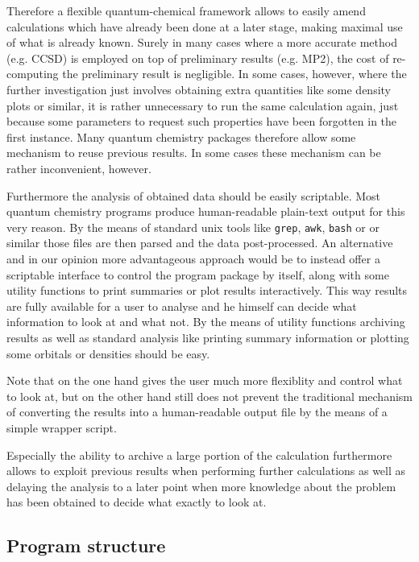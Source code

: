 Therefore a flexible quantum-chemical framework allows to
easily amend calculations which have already been done
at a later stage, making maximal use of what is already known.
Surely in many cases where a more accurate method (e.g. CCSD) is employed
on top of preliminary results (e.g. MP2),
the cost of re-computing the preliminary result is negligible.
In some cases, however,
where the further investigation just involves obtaining
extra quantities like some density plots or similar,
it is rather unnecessary to run the same calculation again,
just because some parameters to request such properties
have been forgotten in the first instance.
Many quantum chemistry packages therefore allow
some mechanism to reuse previous results.
In some cases these mechanism can be rather inconvenient, however.

Furthermore the analysis of obtained data should be easily scriptable.
Most quantum chemistry programs produce human-readable plain-text output
for this very reason.
By the means of standard unix tools like \texttt{grep}, \texttt{awk},
\texttt{bash} or \python or similar those files are then parsed and
the data post-processed.
An alternative and in our opinion more advantageous approach
would be to instead offer a scriptable interface to control
the program package by itself,
along with some utility functions to print summaries
or plot results interactively.
This way results are fully available for a user to analyse
and he himself can decide what information to look at
and what not.
By the means of utility functions
archiving results as well as standard analysis
like printing summary information or plotting some orbitals or densities
should be easy.

Note that on the one hand gives the user much more flexiblity and control
what to look at,
but on the other hand still does not prevent the traditional
mechanism of converting the results into a human-readable output file
by the means of a simple wrapper script.

Especially the ability to archive a large portion of the calculation
furthermore allows to exploit previous results when performing
further calculations as well as delaying the analysis
to a later point when \eg more knowledge about the
problem has been obtained to decide what exactly to look at.
%
%



\subsection{Program structure}
\label{sec:program-structure}


